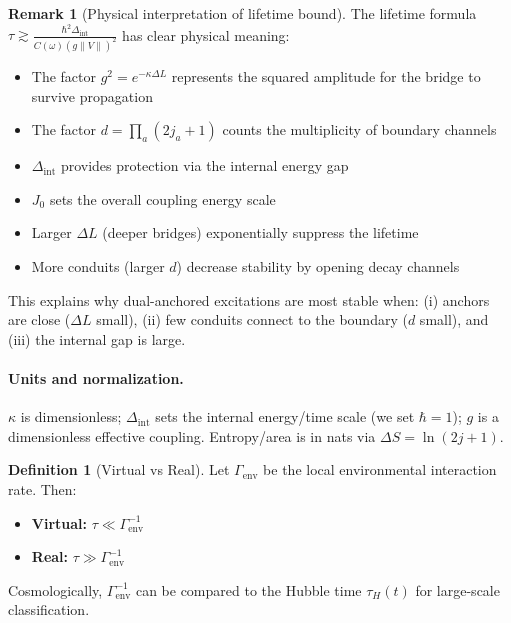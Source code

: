 \documentclass[11pt]{article}
\theoremstyle{plain}
\theoremstyle{definition}
\newtheorem{definition}[theorem]{Definition}
\newtheorem{remark}[theorem]{Remark}
\begin{document}
\begin{remark}[Physical interpretation of lifetime bound]
  The lifetime formula $\tau \gtrsim \frac{\hbar^2 \Delta_{\mathrm{int}}}{C(\omega)(g\|V\|)^2}$ has clear physical meaning:
  \begin{itemize}
    \item The factor $g^2 = e^{-\kappa \Delta L}$ represents the squared amplitude for the bridge to survive propagation
    \item The factor $d = \prod_a(2j_a+1)$ counts the multiplicity of boundary channels
    \item $\Delta_{\mathrm{int}}$ provides protection via the internal energy gap
    \item $J_0$ sets the overall coupling energy scale
    \item Larger $\Delta L$ (deeper bridges) exponentially suppress the lifetime
    \item More conduits (larger $d$) decrease stability by opening decay channels
  \end{itemize}
  This explains why dual-anchored excitations are most stable when: (i) anchors are close ($\Delta L$ small), (ii) few conduits connect to the boundary ($d$ small), and (iii) the internal gap is large.
\end{remark}

\paragraph{Units and normalization.}
$\kappa$ is dimensionless; $\Delta_{\mathrm{int}}$ sets the internal energy/time scale (we set $\hbar=1$); $g$ is a dimensionless effective coupling. Entropy/area is in nats via $\Delta S=\ln(2j+1)$.

\begin{definition}[Virtual vs Real]
  Let $\Gamma_{\mathrm{env}}$ be the local environmental interaction rate. Then:
  \begin{itemize}
    \item \textbf{Virtual:} $\tau \ll \Gamma_{\mathrm{env}}^{-1}$
    \item \textbf{Real:} $\tau \gg \Gamma_{\mathrm{env}}^{-1}$
  \end{itemize}
  Cosmologically, $\Gamma_{\mathrm{env}}^{-1}$ can be compared to the Hubble time $\tau_H(t)$ for large-scale classification.
\end{definition}
\end{document}
